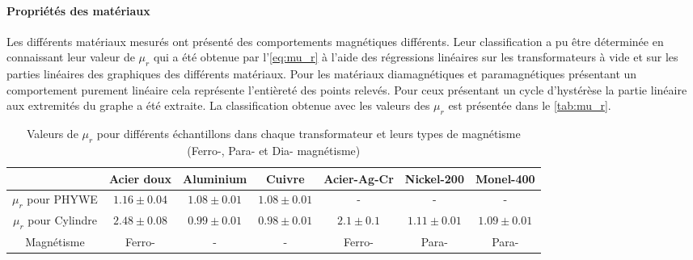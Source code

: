 \paragraph{Propriétés des matériaux}
Les différents matériaux mesurés ont présenté des comportements magnétiques différents. Leur classification a pu être déterminée en connaissant leur valeur de \(\mu_r\) qui a été obtenue par l'\autoref{eq:mu_r} à l'aide des régressions linéaires sur les transformateurs à vide et sur les parties linéaires des graphiques des différents matériaux. Pour les matériaux diamagnétiques et paramagnétiques présentant un comportement purement linéaire cela représente l'entièreté des points relevés. Pour ceux présentant un cycle d'hystérèse la partie linéaire aux extremités du graphe a été extraite. La classification obtenue avec les valeurs des \(\mu_r\) est présentée dans le \autoref{tab:mu_r}.

\begin{table}[h]
    \vspace{5pt}
    \centering
    \begin{adjustbox}{width=\textwidth}
        \begin{tabulary}{1.2\linewidth}{|c c c c c c c|}
            \toprule
            & Acier doux & Aluminium & Cuivre & Acier-Ag-Cr & Nickel-200 & Monel-400 \\
            \midrule
            \(\mu_r\) pour PHYWE & \(1.16 \pm 0.04\) & \(1.08 \pm 0.01\) & \(1.08 \pm 0.01\) & - & - & - \\
            \(\mu_r\) pour Cylindre & \(2.48 \pm 0.08\) & \(0.99 \pm 0.01\) & \(0.98 \pm 0.01\) & \(2.1 \pm 0.1\) & \(1.11 \pm 0.01\) & \(1.09 \pm 0.01\) \\
            Magnétisme & Ferro- & - & - & Ferro- & Para- & Para- \\
            \bottomrule
        \end{tabulary}
    \end{adjustbox}
    \caption{Valeurs de \(\mu_r\) pour différents échantillons dans chaque transformateur et leurs types de magnétisme (Ferro-, Para- et Dia- magnétisme)}
    \label{tab:mu_r}
\end{table}


